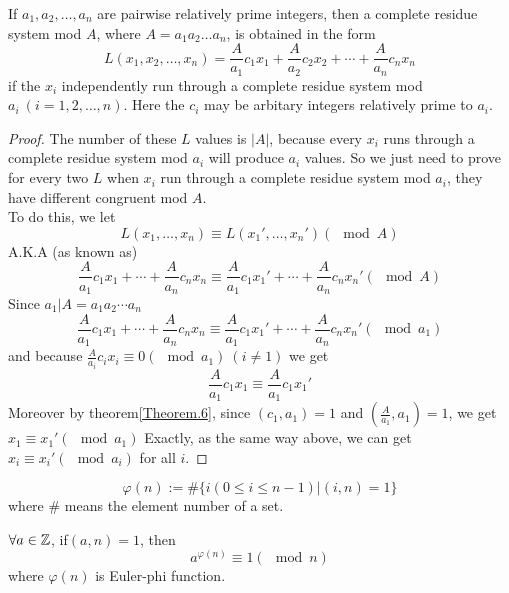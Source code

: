 \documentclass[11pt]{Numbertheory}
\begin{document}
\begin{theorem}
    If $a_1, a_2, \ldots, a_n$ are pairwise relatively prime integers, then a complete residue system mod $A$, where 
    $A = a_1a_2\ldots a_n$, is obtained in the form 
    \[ L(x_1, x_2, \ldots, x_n) = \frac{A}{a_1}c_1 x_1 + \frac{A}{a_2} c_2x_2+\cdots+\frac{A}{a_n}c_n x_n\] 
    if the $x_i$ independently run through a complete residue system mod $a_i\ (i =1, 2,\ldots, n)$. Here the $c_i$
    may be arbitary integers relatively prime to $a_i$.
\end{theorem}\label{Theorem.8}

\begin{proof}
    The number of these $L$ values is $|A|$, because every $x_i$ runs through a complete residue system mod $a_i$ will produce 
    $a_i$ values. So we just need to prove for every two $L$ when $x_i$ run through a complete residue system mod $a_i$, they have 
    different congruent mod $A$.\\
    To do this, we let
    \[L(x_1, \ldots, x_n) \equiv L(x_1', \ldots, x_n') (\mod A) \]
    A.K.A (as known as)
    \[ \frac{A}{a_1}c_1 x_1 + \cdots + \frac{A}{a_n}c_n x_n \equiv \frac{A}{a_1}c_1 x_1' + \cdots + \frac{A}{a_n}c_n x_n' (\mod A)\]
    Since $a_1 | A=a_1a_2\cdots a_n$
    \[ \frac{A}{a_1}c_1 x_1 + \cdots + \frac{A}{a_n}c_n x_n \equiv \frac{A}{a_1}c_1 x_1' + \cdots + \frac{A}{a_n}c_n x_n' (\mod a_1)\]
    and because $\frac{A}{a_i}c_i x_i \equiv 0 (\mod a_1)\ (i\ne 1)$
    we  get 
    \[ \frac{A}{a_1}c_1 x_1\equiv \frac{A}{a_1}c_1 x_1'\]
    Moreover by theorem\ref{Theorem.6}, since $(c_1, a_1) = 1$ and $\left( \frac{A}{a_1}, a_1 \right)=1$, we get $x_1\equiv x_1' (\mod a_1)$
    Exactly, as the same way above, we can get $x_i\equiv x_i'(\mod a_i)$ for all $i$.
\end{proof}








\begin{definition} 
\[  
    \varphi(n) := \#\{i(0\le i\le n-1)|(i, n) = 1\}
\]
    where \# means the element number of a set.
\end{definition}


\begin{theorem} 
    $\forall a \in \mathbb{Z}$, if$(a,n)=1$, then 
    \[  a^{\varphi(n)} \equiv 1 (\mod n)\]
    where $\varphi(n)$ is Euler-phi function. 
\end{theorem}
\end{document}
